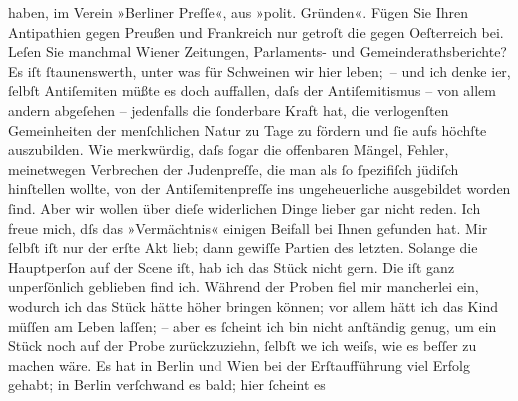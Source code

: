 \begin{ledgroupsized}[t]{13cm}
                    haben, im Verein »Berliner Preſſe«, aus »polit.
                    Gründen«. Fügen Sie Ihren Antipathien gegen Preußen und Frankreich nur getroſt \introOben{}die\introOben{} gegen Oeſterreich bei. Leſen Sie manchmal Wiener Zeitungen, Parlaments- und
                    Gemeinderathsberichte? Es iſt ſtaunenswerth, unter was für Schweinen wir hier
                    leben; – und {\pb}ich denke i{\geminationm}er, ſelbſt Antiſemiten müßte es doch auffallen,
                    daſs der Antiſemitismus – von allem andern abgeſehen – jedenfalls die ſonderbare
                    Kraft hat, die verlogenſten Gemeinheiten der menſchlichen Natur zu Tage zu
                    fördern und ſie aufs höchſte auszubilden. Wie merkwürdig, daſs ſogar die
                    offenbaren Mängel, Fehler, meinetwegen Verbrechen der Judenpreſſe, die man als
                    ſo ſpezifiſch jüdiſch hinſtellen wollte, von der Antiſemiten{\pb}preſſe ins ungeheuerliche ausgebildet worden
                    ſind. Aber wir wollen über dieſe widerlichen Dinge lieber gar nicht reden.\pend
           \pstart
           Ich freue mich, dſs das »Vermächtnis« einigen
                    Beifall bei Ihnen gefunden hat. Mir ſelbſt iſt nur der erſte Akt lieb; dann
                    gewiſſe Partien des letzten. Solange die Hauptperſon auf der Scene iſt, hab ich
                    das Stück nicht gern. Die iſt ganz unperſönlich geblieben find ich. Während der
                    Proben fiel mir mancherlei ein, wodurch ich das Stück hätte höher bringen
                    können; vor allem hätt ich das Kind {\pb}müſſen
                    am Leben laſſen; – aber es ſcheint ich bin nicht anſtändig genug, um ein Stück
                    noch auf der Probe zurückzuziehn, ſelbſt we{\geminationn} ich
                    weiſs, wie es beſſer zu machen wäre. Es hat in Berlin un\textcolor{gray}{d}{ }Wien bei der Erſtaufführung viel Erfolg gehabt;
                    in Berlin verſchwand es bald; hier ſcheint es

\end{ledgroupsized}
